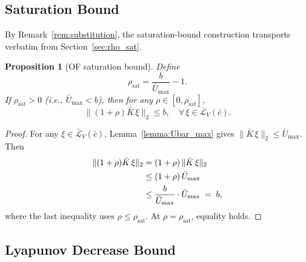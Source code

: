 \documentclass[final,5p,times,authoryear]{elsarticle}
\theoremstyle{plain}
\newtheorem{proposition}{Proposition}
\theoremstyle{definition}
\theoremstyle{remark}
\begin{document}
\subsection{Saturation Bound}\label{sec:of_sat}

By Remark~\ref{rem:substitution}, the saturation-bound construction
transports verbatim from Section~\ref{sec:rho_sat}.

\begin{proposition}[OF saturation bound]\label{prop:of_rho_sat}
Define
\begin{equation}
\rho_{\mathrm{sat}} = \frac{b}{\bar U_{\max}} - 1.
\label{eq:of_rho_sat}
\end{equation}
If $\rho_{\mathrm{sat}} > 0$ (i.e., $\bar U_{\max} < b$), then for any
$\rho \in [0, \rho_{\mathrm{sat}}]$,
\begin{equation}
\|(1 + \rho)\bar K\,\xi\|_2 \leq b,
\quad \forall\,\xi \in \bar{\mathcal L}_V(\bar c).
\end{equation}
\end{proposition}

\begin{proof}
For any $\xi \in \bar{\mathcal L}_V(\bar c)$,
Lemma~\ref{lemma:Ubar_max} gives $\|\bar K\,\xi\|_2 \leq \bar U_{\max}$.
Then
\begin{align}
\|(1 + \rho)\bar K\,\xi\|_2
&= (1 + \rho)\,\|\bar K\,\xi\|_2 \notag\\
&\leq (1 + \rho)\,\bar U_{\max} \notag\\
&\leq \frac{b}{\bar U_{\max}}\cdot \bar U_{\max} \;=\; b,
\end{align}
where the last inequality uses $\rho \leq \rho_{\mathrm{sat}}$.  At
$\rho = \rho_{\mathrm{sat}}$, equality holds.
\end{proof}

\subsection{Lyapunov Decrease Bound}\label{sec:of_lyap}
\end{document}
